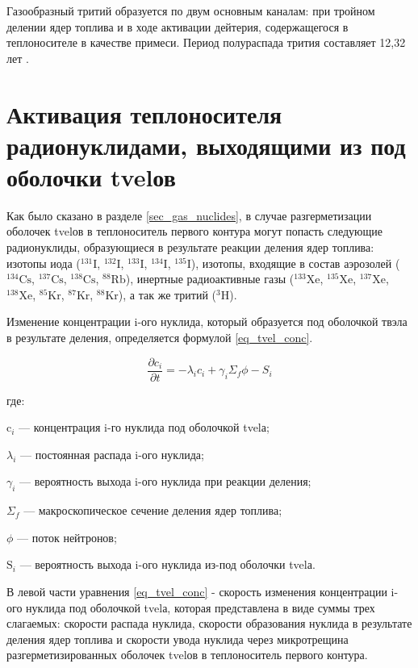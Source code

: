Газообразный тритий образуется по двум основным каналам: при тройном делении ядер топлива и в ходе активации дейтерия, 
содержащегося в теплоносителе в качестве примеси. Период полураспада трития составляет 12,32 лет \cite{bekman_nuclear}.

\section{Активация теплоносителя радионуклидами, выходящими из под оболочки \ac{tvel}ов}
\label{sec_tvel_nuclides}

Как было сказано в разделе \ref{sec_gas_nuclides}, в случае разгерметизации оболочек \ac{tvel}ов в теплоноситель 
первого контура могут попасть следующие радионуклиды, образующиеся в результате реакции деления ядер топлива: изотопы 
иода ($^{131}\text{I}$, $^{132}\text{I}$, $^{133}\text{I}$, $^{134}\text{I}$, $^{135}\text{I}$), изотопы, входящие в 
состав аэрозолей ($^{134}\text{Cs}$, $^{137}\text{Cs}$, $^{138}\text{Cs}$, $^{88}\text{Rb}$), инертные радиоактивные 
газы ($^{133}\text{Xe}$, $^{135}\text{Xe}$, $^{137}\text{Xe}$, $^{138}\text{Xe}$, $^{85}\text{Kr}$, $^{87}\text{Kr}$, 
$^{88}\text{Kr}$), а так же тритий ($^{3}\text{H}$).

Изменение концентрации i-ого нуклида, который образуется под оболочкой твэла в результате деления, определяется формулой 
\ref{eq_tvel_conc}.

\begin{equation}
    \label{eq_tvel_conc}
    \frac{\partial c_{i}}{\partial t} = -\lambda_{i}c_{i} + \gamma_{i}\Sigma_{f}\phi - S_{i}
\end{equation}

где:
\begin{description}
    \item $\text{c}_i$ --- концентрация i-го нуклида под оболочкой \ac{tvel}а;
    \item $\lambda_{i}$ ---  постоянная распада i-ого нуклида;
    \item $\gamma_{i}$ --- вероятность выхода i-ого нуклида при реакции деления;
    \item $\Sigma_{f}$ --- макроскопическое сечение деления ядер топлива;
    \item $\phi$ --- поток нейтронов;
    \item $\text{S}_{i}$ --- вероятность выхода i-ого нуклида из-под оболочки \ac{tvel}а.
\end{description}

В левой части уравнения \ref{eq_tvel_conc} - скорость изменения концентрации i-ого нуклида под оболочкой \ac{tvel}а, 
которая представлена в виде суммы трех слагаемых: скорости распада нуклида, скорости образования нуклида в результате 
деления ядер топлива и скорости увода нуклида через микротрещина разгерметизированных оболочек \ac{tvel}ов в 
теплоноситель первого контура.

